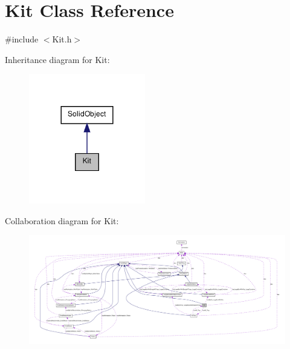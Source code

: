 \hypertarget{class_kit}{
\section{Kit Class Reference}
\label{class_kit}
}


{\ttfamily \#include $<$Kit.h$>$}



Inheritance diagram for Kit:\nopagebreak
\begin{figure}[H]
\begin{center}
\leavevmode
\includegraphics[width=144pt]{class_kit__inherit__graph}
\end{center}
\end{figure}


Collaboration diagram for Kit:\nopagebreak
\begin{figure}[H]
\begin{center}
\leavevmode
\includegraphics[width=400pt]{class_kit__coll__graph}
\end{center}
\end{figure}
